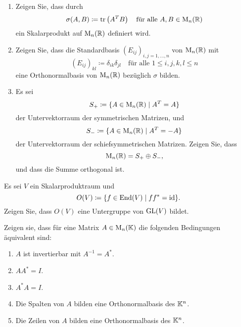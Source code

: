 \documentclass[a4paper,10pt]{article}
\begin{document}
\begin{question}
  \begin{enumerate}[leftmargin=*]
    \item
      Zeigen Sie, dass durch
      \[
        \sigma(A, B) \coloneqq \operatorname{tr}\left( A^T B \right)
        \quad
        \text{für alle $A, B \in \operatorname{M}_n(\mathbb{R})$}
      \]
      ein Skalarprodukt auf $\operatorname{M}_n(\mathbb{R})$ definiert wird.
    \item
      Zeigen Sie, dass die Standardbasis $(E_{ij})_{i,j=1,\dotsc,n}$ von $\operatorname{M}_n(\mathbb{R})$ mit
      \[
        (E_{ij})_{kl} \coloneqq \delta_{ik} \delta_{jl}
        \quad
        \text{für alle $1 \leq i,j,k,l \leq n$}
      \]
      eine Orthonormalbasis von $\operatorname{M}_n(\mathbb{R})$ bezüglich $\sigma$ bilden.
    \item
      Es sei
      \[
        S_+ \coloneqq \{A \in \operatorname{M}_n(\mathbb{R}) \mid A^T = A\}
      \]
      der Untervektorraum der symmetrischen Matrizen, und
      \[
        S_- \coloneqq \{A \in \operatorname{M}_n(\mathbb{R}) \mid A^T  = -A\}
      \]
      der Untervektorraum der schiefsymmetrischen Matrizen.
      Zeigen Sie, dass
      \[
        \operatorname{M}_n(\mathbb{R}) = S_+ \oplus S_-,
      \]
      und dass die Summe orthogonal ist.
  \end{enumerate}
\end{question}


\begin{question}
  Es sei $V$ ein Skalarproduktraum und
  \[
    O(V) \coloneqq \{ f \in \mathrm{End}(V) \mid f f^* = \operatorname{id} \}.
  \]
  Zeigen Sie, dass $O(V)$ eine Untergruppe von $\operatorname{GL}(V)$ bildet.
\end{question}


\begin{question}
Zeigen sie, dass für eine Matrix $A \in \operatorname{M}_n(\mathbb{K})$ die folgenden Bedingungen äquivalent sind:
  \begin{enumerate}
    \item
      $A$ ist invertierbar mit $A^{-1} = A^*$.
    \item
      $A A^* = I$.
    \item
      $A^* A = I$.
    \item
      Die Spalten von $A$ bilden eine Orthonormalbasis des $\mathbb{K}^n$.
    \item
      Die Zeilen von $A$ bilden eine Orthonormalbasis des $\mathbb{K}^n$.
  \end{enumerate}
\end{question}
\end{document}
